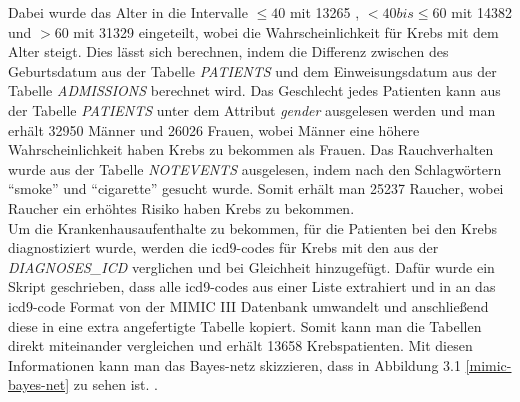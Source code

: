 \documentclass[german,version-2020-11]{uzl-thesis}
\begin{document}
Dabei wurde das Alter in die Intervalle  $\leq 40$ mit 13265 , $< 40 bis \leq 60$ mit 14382  und $>60$ mit 31329 eingeteilt, wobei die Wahrscheinlichkeit für Krebs mit dem Alter steigt. Dies lässt sich berechnen, indem die Differenz zwischen des Geburtsdatum aus der Tabelle \textit{PATIENTS} und dem Einweisungsdatum aus der Tabelle \textit{ADMISSIONS} berechnet wird.
Das Geschlecht jedes Patienten kann aus der Tabelle \textit{PATIENTS} unter dem Attribut \textit{gender} ausgelesen werden und man erhält 32950 Männer und 26026 Frauen, wobei Männer eine höhere Wahrscheinlichkeit haben Krebs zu bekommen als Frauen. Das Rauchverhalten wurde aus der Tabelle \textit{NOTEVENTS} ausgelesen, indem nach den Schlagwörtern \enquote{smoke} und \enquote{cigarette} gesucht wurde. Somit erhält man 25237 Raucher, wobei Raucher ein erhöhtes Risiko haben Krebs zu bekommen. \\
Um die Krankenhausaufenthalte zu bekommen, für die Patienten bei den  Krebs diagnostiziert wurde, werden die icd9-codes für Krebs \cite{16} mit den aus der \textit{DIAGNOSES\_ICD} verglichen und bei Gleichheit hinzugefügt. Dafür wurde ein Skript geschrieben, dass alle icd9-codes aus einer Liste extrahiert und in an das icd9-code Format von der MIMIC III Datenbank umwandelt und anschließend diese in eine extra angefertigte Tabelle kopiert. Somit kann man die Tabellen direkt miteinander vergleichen und erhält 13658 Krebspatienten. 
Mit diesen Informationen kann man das Bayes-netz skizzieren, dass in Abbildung 3.1 \ref{mimic-bayes-net} zu sehen ist.
. \\ 
\end{document}
